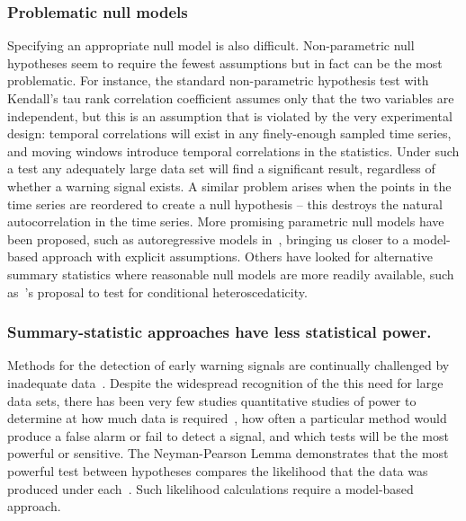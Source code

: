 \documentclass[authoryear,review,11pt]{elsarticle}
\begin{document}
\subsubsection*{Problematic null models}
Specifying an appropriate null model is also difficult.
Non-parametric null hypotheses seem to require the fewest assumptions but in fact can be the most problematic.
For instance, the standard non-parametric hypothesis test with Kendall's tau rank correlation coefficient
assumes only that the two variables are independent,
but this is an assumption that is violated by the very experimental design:
temporal correlations will exist in any finely-enough sampled time series,
and moving windows introduce temporal correlations in the statistics.
Under such a test any adequately large data set will find a significant result,
regardless of whether a warning signal exists.
A similar problem arises when the points in the time series are reordered to create a null hypothesis --
this destroys the natural autocorrelation in the time series.
More promising parametric null models have been proposed,
such as autoregressive models in~\citet{Dakos2008}, bringing us
closer to a model-based approach with explicit assumptions.
Others have looked for alternative summary statistics where
reasonable null models are more readily available,
such as~\citet{Seekell2011}'s proposal to test for conditional heteroscedaticity.

\subsubsection*{Summary-statistic approaches have less statistical power.}
Methods for the detection of early warning signals are continually challenged by inadequate data~\citep{Inman2011, Scheffer2010,Held2004, Dakos2008, Scheffer2009, Guttal2008, Carpenter2011, Bestelmeyer2011}.
Despite the widespread recognition of the this need for large data sets,
there has been very few studies quantitative studies of power to determine at how much data is required~\citep{Contamin2009},
how often a particular method would produce a false alarm or fail to detect a signal,
and which tests will be the most powerful or sensitive.
The Neyman-Pearson Lemma demonstrates that the most powerful test between hypotheses
compares the likelihood that the data was produced under each~\citep{Neyman1933}.
Such likelihood calculations require a model-based approach.
\end{document}
